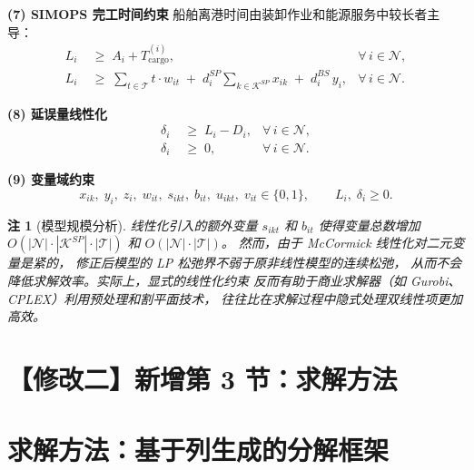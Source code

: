 \documentclass[11pt,a4paper]{article}
\newtheorem{remark}{注}
\begin{document}
\medskip
\noindent\textbf{(7) SIMOPS 完工时间约束}\quad
船舶离港时间由装卸作业和能源服务中较长者主导：
%
\begin{align}
  L_i &\;\geq\; A_i + T_{\text{cargo}}^{(i)},
    & \forall\, i \in \mathcal{N},
    \tag{14} \\[4pt]
  L_i &\;\geq\; \sum_{t \in \mathcal{T}} t \cdot w_{it}
    \;+\; d_i^{SP} \sum_{k \in \mathcal{K}^{SP}} x_{ik}
    \;+\; d_i^{BS}\, y_i,
    & \forall\, i \in \mathcal{N}.
    \tag{15}
\end{align}

\medskip
\noindent\textbf{(8) 延误量线性化}
%
\begin{align}
  \delta_i &\;\geq\; L_i - D_i,
    & \forall\, i \in \mathcal{N},
    \tag{16} \\[4pt]
  \delta_i &\;\geq\; 0,
    & \forall\, i \in \mathcal{N}.
    \tag{17}
\end{align}

\medskip
\noindent\textbf{(9) 变量域约束}
%
\begin{equation}
  x_{ik},\; y_i,\; z_i,\; w_{it},\; s_{ikt},\; b_{it},\;
  u_{ikt},\; v_{it} \in \{0,1\},
  \qquad L_i,\; \delta_i \geq 0.
  \tag{18}
\end{equation}

\begin{remark}[模型规模分析]
线性化引入的额外变量 $s_{ikt}$ 和 $b_{it}$ 使得变量总数增加
$O(|\mathcal{N}| \cdot |\mathcal{K}^{SP}| \cdot |\mathcal{T}|)$ 和 $O(|\mathcal{N}| \cdot |\mathcal{T}|)$。
然而，由于 McCormick 线性化对二元变量是紧的，
修正后模型的 LP 松弛界不弱于原非线性模型的连续松弛，
从而不会降低求解效率。实际上，显式的线性化约束
反而有助于商业求解器（如 Gurobi、CPLEX）利用预处理和割平面技术，
往往比在求解过程中隐式处理双线性项更加高效。
\end{remark}


\newpage

\section*{【修改二】新增第 3 节：求解方法}

\setcounter{section}{2}
\setcounter{equation}{18}

\section{求解方法：基于列生成的分解框架}
\end{document}
